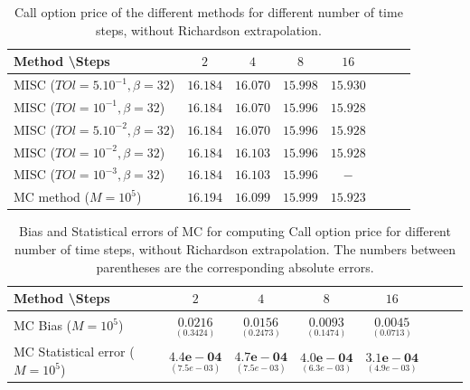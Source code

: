 \documentclass[11pt]{article}
\begin{document}
\begin{table}[h!]
	\centering
	\begin{tabular}{l*{6}{c}r}
		Method \textbackslash  Steps            & $2$ & $4$ & $8$ & $16$ &   \\
		\hline
		MISC ($TOl=5.10^{-1},\beta=32$)  & $16.184$ & $16.070$ & $15.998$ & $15.930$  \\
		MISC ($TOl=10^{-1},\beta=32$)  & $16.184$ & $16.070$ & $15.996$ &$15.928$  \\
		MISC ($TOl=5.10^{-2},\beta=32$) & $16.184$ & $16.070$ & $15.996$ & $15.928$  \\
		MISC ($TOl=10^{-2},\beta=32$) & $16.184$ & $16.103$ & $15.996$ &$15.928$  \\
		MISC ($TOl=10^{-3},\beta=32$) & $16.184$ & $16.103$ & $15.996$ & $-$  \\
		
		\hline
		MC method ($M=10^{5}$)   & $  16.194$ & $ 16.099$ & $
		15.999$ & $  15.923$  \\
		\hline
	\end{tabular}
	\caption{Call option price of the different methods for different number of time steps, without Richardson extrapolation.}
	\label{table:Call option price of the different methods for different number of time steps, without Richardson extrapolation.}
\end{table}


\begin{table}[h!]
	\centering
	\begin{tabular}{l*{6}{c}r}
		Method \textbackslash  Steps            & $2$ & $4$ & $8$ & $16$  \\
		\hline
		MC Bias ($M=10^{5}$)  & 	$ \underset{(      0.3424 )}{\mathbf{0.0216}}$  & $\underset{(0.2473)}{\mathbf{ 0.0156
		}}$  & $\underset{(  0.1474)}{\mathbf{0.0093}}$ & $\underset{(     0.0713
	)}{\mathbf{  0.0045 }}$\\ 
		
		MC Statistical error  ($M=10^{5}$)   & 	$ \underset{( 7.5e-03  )}{\mathbf{4.4e-04}}$  & $\underset{(7.5e-03 )}{\mathbf{ 4.7e-04
		}}$  & $\underset{(6.3e-03 )}{\mathbf{4.0e-04}}$ & $\underset{( 4.9e-03 )}{\mathbf{ 3.1e-04  }}$\\ 
	
%		
		\hline
	\end{tabular}
	\caption{Bias and Statistical errors of MC  for computing Call option price  for different number of time steps, without Richardson extrapolation. The numbers between parentheses are the corresponding absolute errors.}
	\label{Bias and Statistical errors of MC  for computing Call option price  for different number of time steps, without Richardson extrapolation. The numbers between parentheses are the corresponding absolute errors.}
\end{table}
\end{document}
